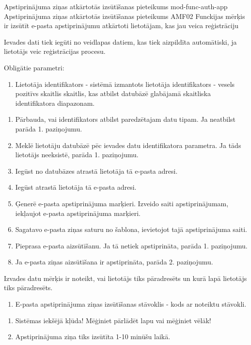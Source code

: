 \moduleFunctionTable
{Apstiprinājuma ziņas atkārtotās izsūtīšanas pieteikums}
{mod-func-auth-app}
{Apstiprinājuma ziņas atkārtotās izsūtīšanas pieteikums}
{AMF02}
{
	Funckijas mērķis ir izsūtīt e-pasta apstiprinājumu atkārtoti lietotājam, kas jau veica reģistrāciju
}
{
	Ievades dati tiek iegūti no veidlapas datiem, kas tiek aizpildīta automātiski, ja lietotājs veic reģistrācijas procesu.

	Obligātie parametri:
	\begin{enumerate}
		\item Lietotāja identifikators - sistēmā izmantots lietotāja identifikators - vesels pozitīvs skaitlis skaitlis, kas atbilst datubāzē glabājamā skaitliska identifikatora diapazonam.
	\end{enumerate}
}
{
	\begin{enumerate}
		\item Pārbauda, vai identifikators atbilst paredzētajam datu tipam.
		      Ja neatbilst parāda 1. paziņojumu.
		\item Meklē lietotāju datubāzē pēc ievades datu identifikatora parametra.
		      Ja tāds lietotājs neeksistē, parāda 1. paziņojumu.
		\item Iegūst no datubāzes atrastā lietotāja tā e-pasta adresi.
		\item Iegūst atrastā lietotāja tā e-pasta adresi.
		\item Ģenerē e-pasta apstiprinājuma marķieri.
		      Izveido saiti apstiprinājumam, iekļaujot e-pasta apstiprinājuma marķieri.
		\item Sagatavo e-pasta ziņas saturu no šablona, ievietojot tajā apstiprinājuma saiti.
		\item Pieprasa e-pasta aizsūtīšanu.
		      Ja tā netiek apstiprināta, parāda 1. paziņojumu.
		\item Ja e-pasta ziņas aizsūtīšana ir apstiprināta, parāda 2. paziņojumu.
	\end{enumerate}
}
{
	Izvades datu mērķis ir noteikt, vai lietotājs tiks pāradresēts un kurā lapā lietotājs tiks pāradresēts.
	\begin{enumerate}
		\item E-pasta apstiprinājuma ziņas izsūtīšanas stāvoklis - kods ar noteiktu stāvokli.
	\end{enumerate}
}
{
	\begin{enumerate}
		\item Sistēmas iekšējā kļūda! Mēģiniet pārlādēt lapu vai mēģiniet vēlāk!
		\item Apstiprinājuma ziņa tiks izsūtīta 1-10 minūšu laikā.
	\end{enumerate}
}
